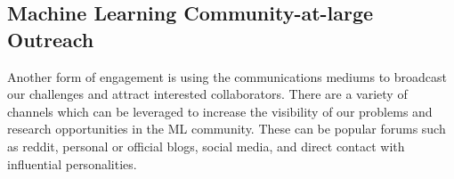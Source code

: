 

\subsection{Machine Learning Community-at-large Outreach}
Another form of engagement is using the communications mediums to broadcast our challenges and attract interested collaborators. There are a variety of channels which can be leveraged to increase the visibility of our problems and research opportunities in the ML community. These can be popular forums such as reddit, personal or official blogs, social media, and direct contact with influential personalities.


